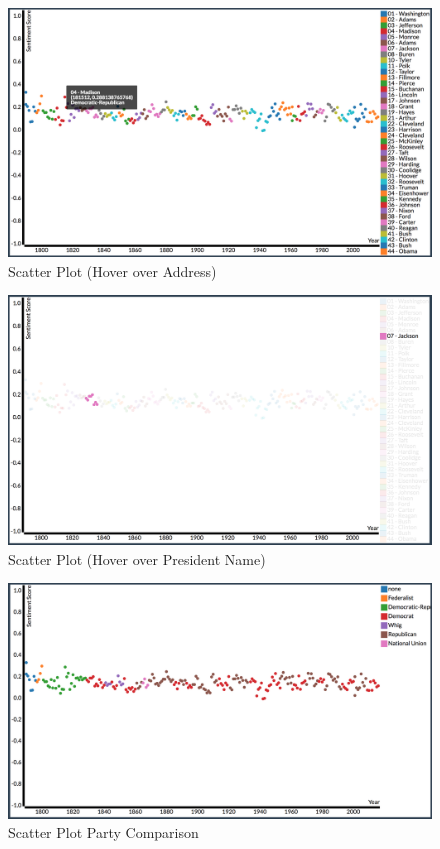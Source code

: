 \begin{figure}
  \includegraphics[width=\columnwidth]{images/hover_address.png}
  \caption{Scatter Plot (Hover over Address)}
  \label{fig:scatterplot2}
\end{figure}

\begin{figure}
  \includegraphics[width=\columnwidth]{images/hover_president.png}
  \caption{Scatter Plot (Hover over President Name)}
  \label{fig:scatterplot3}
\end{figure}

\begin{figure}
  \includegraphics[width=\columnwidth]{images/scatter_plot_party.png}
  \caption{Scatter Plot Party Comparison}
  \label{fig:scatterplot4}
\end{figure}

